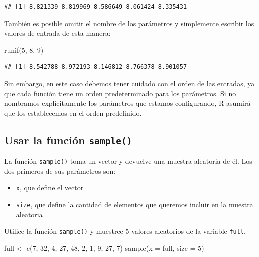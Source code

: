 \documentclass[
]{book}
\newenvironment{Shaded}{\begin{snugshade}}{\end{snugshade}}
\newcommand{\AttributeTok}[1]{\textcolor[rgb]{0.77,0.63,0.00}{#1}}
\newcommand{\DecValTok}[1]{\textcolor[rgb]{0.00,0.00,0.81}{#1}}
\newcommand{\FunctionTok}[1]{\textcolor[rgb]{0.00,0.00,0.00}{#1}}
\newcommand{\NormalTok}[1]{#1}
\newcommand{\OtherTok}[1]{\textcolor[rgb]{0.56,0.35,0.01}{#1}}
\providecommand{\tightlist}{%
  \setlength{\itemsep}{0pt}\setlength{\parskip}{0pt}}
\begin{document}
\begin{verbatim}
## [1] 8.821339 8.819969 8.586649 8.061424 8.335431
\end{verbatim}

También es posible omitir el nombre de los parámetros y simplemente escribir los valores de entrada de esta manera:

\begin{Shaded}
\begin{Highlighting}[]
\FunctionTok{runif}\NormalTok{(}\DecValTok{5}\NormalTok{, }\DecValTok{8}\NormalTok{, }\DecValTok{9}\NormalTok{)}
\end{Highlighting}
\end{Shaded}

\begin{verbatim}
## [1] 8.542788 8.972193 8.146812 8.766378 8.901057
\end{verbatim}

Sin embargo, en este caso debemos tener cuidado con el orden de las entradas, ya que cada función tiene un orden predeterminado para los parámetros. Si no nombramos explícitamente los parámetros que estamos configurando, R asumirá que los establecemos en el orden predefinido.

\hypertarget{usar-la-funciuxf3n-sample}{%
\subsection{\texorpdfstring{Usar la función \texttt{sample()}}{Usar la función sample()}}\label{usar-la-funciuxf3n-sample}}

La función \texttt{sample()} toma un vector y devuelve una muestra aleatoria de él. Los dos primeros de sus parámetros son:

\begin{itemize}
\tightlist
\item
  \texttt{x}, que define el vector
\item
  \texttt{size}, que define la cantidad de elementos que queremos incluir en la muestra aleatoria
\end{itemize}

Utilice la función \texttt{sample()} y muestree 5 valores aleatorios de la variable \texttt{full}.

\begin{Shaded}
\begin{Highlighting}[]
\NormalTok{full }\OtherTok{\textless{}{-}} \FunctionTok{c}\NormalTok{(}\DecValTok{7}\NormalTok{, }\DecValTok{32}\NormalTok{, }\DecValTok{4}\NormalTok{, }\DecValTok{27}\NormalTok{, }\DecValTok{48}\NormalTok{, }\DecValTok{2}\NormalTok{, }\DecValTok{1}\NormalTok{, }\DecValTok{9}\NormalTok{, }\DecValTok{27}\NormalTok{, }\DecValTok{7}\NormalTok{)}
\FunctionTok{sample}\NormalTok{(}\AttributeTok{x =}\NormalTok{ full, }\AttributeTok{size =} \DecValTok{5}\NormalTok{)}
\end{Highlighting}
\end{Shaded}
\end{document}
